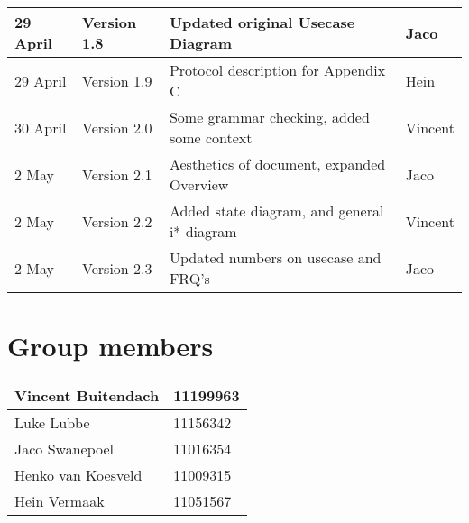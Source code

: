 \begin{center}
\begin{tabular}{|l|l|l|l|}
\hline
29 April & Version 1.8 & Updated original Usecase Diagram& Jaco\\
\hline
29 April & Version 1.9 & Protocol description for Appendix C& Hein\\
\hline
30 April & Version 2.0 & Some grammar checking, added some context & Vincent\\
\hline
2 May & Version 2.1 & Aesthetics of document, expanded Overview& Jaco\\
\hline
2 May & Version 2.2 & Added state diagram, and general i* diagram & Vincent\\
\hline
2 May & Version 2.3 & Updated numbers on usecase and FRQ's & Jaco\\
\hline
\end{tabular}

\vfill
\section{Group members}

\begin{tabular}{|l|l|}

\hline
Vincent Buitendach & 11199963\\
\hline
Luke Lubbe & 11156342\\
\hline
Jaco Swanepoel & 11016354\\
\hline
Henko van Koesveld & 11009315\\
\hline
Hein Vermaak & 11051567\\
\hline

\end{tabular}

\end{center}

